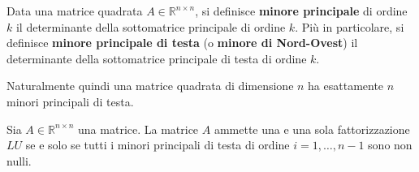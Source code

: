 \begin{definition}
    Data una matrice quadrata $A \in \mathbb{R}^{n\times n}$, si definisce \textbf{minore principale} di ordine $k$ il determinante della sottomatrice principale di ordine $k$. Più in particolare, si definisce \textbf{minore principale di testa} (o \textbf{minore di Nord-Ovest}) il determinante della sottomatrice principale di testa di ordine $k$.
\end{definition}
Naturalmente quindi una matrice quadrata di dimensione $n$ ha esattamente $n$ minori principali di testa.
\begin{theorem}
Sia $\displaystyle A\in \mathbb{R}^{n\times n}$ una matrice. La matrice $\displaystyle A$ ammette una e una sola fattorizzazione $\displaystyle LU$ se e solo se tutti i minori principali di testa di ordine $\displaystyle i=1,\dotsc ,n-1$ sono non nulli.
\label{thm:esist-unicita-LU}
\end{theorem}

